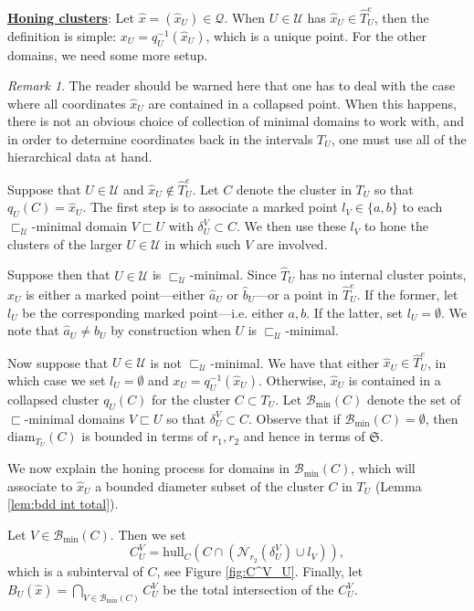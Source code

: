 \documentclass{amsart}
\theoremstyle{definition}
\theoremstyle{remark}
\newtheorem{remark}[theorem]{Remark}
\theoremstyle{definition}
\newcommand{\calB}{\mathcal{B}}
\newcommand{\calN}{\mathcal{N}}
\newcommand{\calQ}{\mathcal{Q}}
\newcommand{\calU}{\mathcal{U}}
\newcommand{\hT}{\widehat{T}}
\newcommand{\hx}{\hat{x}}
\newcommand{\ha}{\hat{a}}
\newcommand{\hb}{\hat{b}}
\newcommand{\BM}{\calB_{\min}}
\newcommand{\diam}{\mathrm{diam}}
\newcommand{\hull}{\mathrm{hull}}
\newcommand{\nest}{\sqsubset}
\begin{document}
\smallskip


\textbf{\underline{Honing clusters}}: Let $\hx = (\hx_U) \in \calQ$.  When $U\in \calU$ has $\hx_U \in \hT^e_U$, then the definition is simple: $x_U = q_U^{-1}(\hx_U)$, which is a unique point.  For the other domains, we need some more setup.

\begin{remark}
    The reader should be warned here that one has to deal with the case where all coordinates $\hx_U$ are contained in a collapsed point.  When this happens, there is not an obvious choice of collection of minimal domains to work with, and in order to determine coordinates back in the intervals $T_U$, one must use all of the hierarchical data at hand. 
\end{remark}

Suppose that $U \in \calU$ and $\hx_U \notin \hT^e_U$.  Let $C$ denote the cluster in $T_U$ so that $q_U(C) = \hx_U$.  The first step is to associate a marked point $l_V \in \{a,b\}$ to each $\nest_{\calU}$-minimal domain $V \nest U$ with $\delta^V_U \subset C$.  We then use these $l_V$ to hone the clusters of the larger $U \in \calU$ in which such $V$ are involved.

Suppose then that $U \in \calU$ is $\nest_{\calU}$-minimal.  Since $\hT_U$ has no internal cluster points, $\hat{x}_U$ is either a marked point---either $\ha_U$ or $\hb_U$---or a point in $\hT^e_U$.  If the former, let $l_U$ be the corresponding marked point---i.e. either $a,b$.  If the latter, set $l_U = \emptyset$.  We note that $\ha_U \neq \hb_U$ by construction when $U$ is $\nest_{\calU}$-minimal.

Now suppose that $U \in \calU$ is not $\nest_{\calU}$-minimal.  We have that either $\hat{x}_U \in \hT^e_U$, in which case we set $l_U = \emptyset$ and $x_U = q_U^{-1}(\hat{x}_U)$.  Otherwise, $\hat{x}_U$ is contained in a collapsed cluster $q_U(C)$ for the cluster $C \subset T_U$.  Let $\calB_{\min}(C)$ denote the set of $\nest$-minimal domains $V\nest U$ so that $\delta^V_U \subset C$.  Observe that if $\BM(C) = \emptyset$, then $\diam_{T_U}(C)$ is bounded in terms of $r_1,r_2$ and hence in terms of $\mathfrak S$.

We now explain the honing process for domains in $\BM(C)$, which will associate to $\hx_U$ a bounded diameter subset of the cluster $C$ in $T_U$ (Lemma \ref{lem:bdd int total}).

Let $V \in \BM(C)$.  Then we set 
$$C^V_U = \hull_C(C \cap (\calN_{r_2}(\delta^V_U) \cup l_V)),$$
which is a subinterval of $C$, see Figure \ref{fig:C^V_U}.  Finally, let $B_U(\hx) = \bigcap_{V \in \BM(C)} C^V_U$ be the total intersection of the $C^V_U$.
\end{document}
